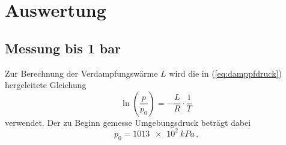 \section{Auswertung}
\label{sec:Auswertung}

\subsection{Messung bis 1 bar}

Zur Berechnung der Verdampfungswärme $L$ wird die in (\ref{eq:damppfdruck}) hergeleitete Gleichung 
\begin{equation}
    \ln \left(\frac{p}{p_{0}}\right) = -\frac{L}{R} \cdot \frac{1}{T}
\end{equation}
verwendet. Der zu Beginn gemesse Umgebungsdruck beträgt dabei
\begin{equation}
    p_{0} = \qty{1013e2}{kPa} \, .
\end{equation}

